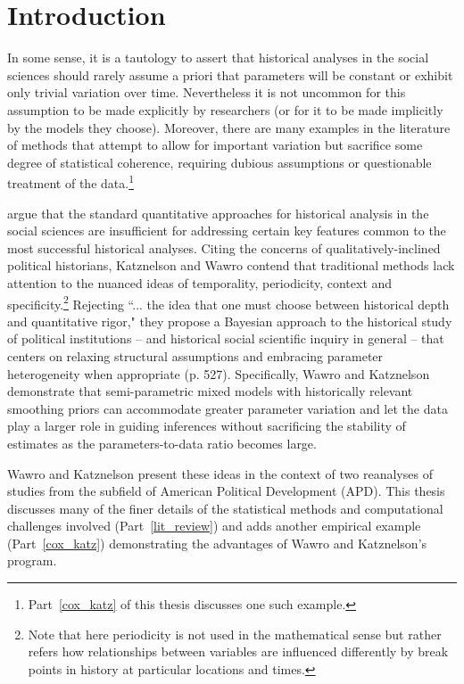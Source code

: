 \chapter{Introduction}
\label{introduction}

In some sense, it is a tautology to assert that historical analyses in the social sciences should rarely assume a priori that parameters will be constant or exhibit only trivial variation over time. Nevertheless it is not uncommon for this assumption to be made explicitly by researchers (or for it to be made implicitly by the models they choose). Moreover, there are many examples in the literature of methods that attempt to allow for important variation but sacrifice some degree of statistical coherence, requiring dubious assumptions or questionable treatment of the data.\footnote{Part~\ref{cox_katz} of this thesis discusses one such example.}  

 argue that the standard quantitative approaches for historical analysis in the social sciences are insufficient for addressing certain key features common to the most successful historical analyses. Citing the concerns of qualitatively-inclined political historians, Katznelson and Wawro contend that traditional methods lack attention to the nuanced ideas of temporality, periodicity, context and specificity.\footnote{Note that here periodicity is not used in the mathematical sense but rather refers how relationships between variables are influenced differently by break points in history at particular locations and times.}  Rejecting ``... the idea that one must choose between historical depth and quantitative rigor," they propose a Bayesian approach to the historical study of political institutions -- and historical social scientific inquiry in general --  that centers on relaxing structural assumptions and embracing  parameter heterogeneity when appropriate (p. 527). Specifically, Wawro and Katznelson demonstrate that semi-parametric mixed models with historically relevant smoothing priors can accommodate greater parameter variation and let the data play a larger role in guiding inferences without sacrificing the stability of estimates as the parameters-to-data ratio becomes large.  

Wawro and Katznelson present these ideas in the context of two reanalyses of studies from the subfield of American Political Development (APD). This thesis discusses many of the finer details of the statistical methods and computational challenges involved (Part~\ref{lit_review}) and adds another empirical example (Part~\ref{cox_katz}) demonstrating the advantages of Wawro and Katznelson's program. 


